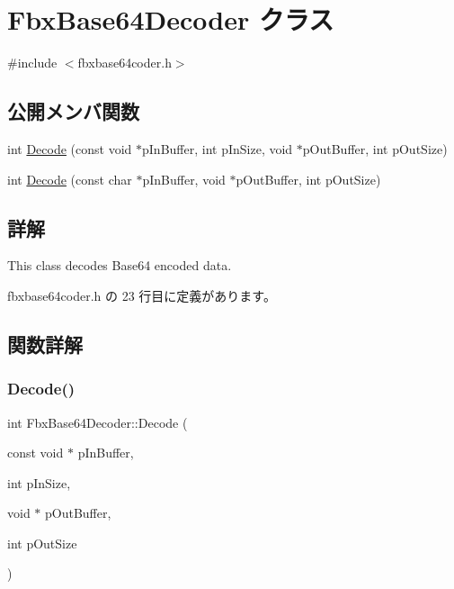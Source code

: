 \hypertarget{class_fbx_base64_decoder}{}\section{Fbx\+Base64\+Decoder クラス}
\label{class_fbx_base64_decoder}


{\ttfamily \#include $<$fbxbase64coder.\+h$>$}

\subsection*{公開メンバ関数}
\begin{DoxyCompactItemize}
\item 
int \hyperlink{class_fbx_base64_decoder_a04ee2ab9e6d914878c565f5e65568761}{Decode} (const void $\ast$p\+In\+Buffer, int p\+In\+Size, void $\ast$p\+Out\+Buffer, int p\+Out\+Size)
\item 
int \hyperlink{class_fbx_base64_decoder_a7fd80ad0699f441dce72f3eff39cddae}{Decode} (const char $\ast$p\+In\+Buffer, void $\ast$p\+Out\+Buffer, int p\+Out\+Size)
\end{DoxyCompactItemize}


\subsection{詳解}
This class decodes Base64 encoded data. 

 fbxbase64coder.\+h の 23 行目に定義があります。



\subsection{関数詳解}
\mbox{\label{class_fbx_base64_decoder_a04ee2ab9e6d914878c565f5e65568761}} 
\subsubsection{\texorpdfstring{Decode()}{Decode()}\hspace{0.1cm}{\footnotesize\ttfamily [1/2]}}
{\footnotesize\ttfamily int Fbx\+Base64\+Decoder\+::\+Decode (\begin{DoxyParamCaption}\item[{const void $\ast$}]{p\+In\+Buffer,  }\item[{int}]{p\+In\+Size,  }\item[{void $\ast$}]{p\+Out\+Buffer,  }\item[{int}]{p\+Out\+Size }\end{DoxyParamCaption})}

